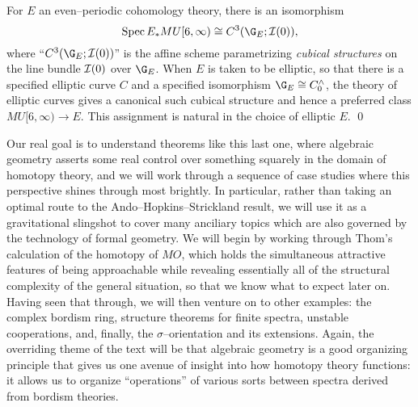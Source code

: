 \begin{theorem}\label{IntroAHSMU6Thm}
For $E$ an even--periodic cohomology theory, there is an isomorphism \[\Spec E_* MU[6, \infty) \cong C^3(\G_E; \sheaf I(0)),\] where ``$C^3(\G_E; \sheaf I(0))$'' is the affine scheme parametrizing \textit{cubical structures} on the line bundle $\mathcal{I}(0)$ over $\G_E$.  When $E$ is taken to be elliptic, so that there is a specified elliptic curve $C$ and a specified isomorphism $\G_E \cong C^\wedge_0$, the theory of elliptic curves gives a canonical such cubical structure and hence a preferred class $MU[6, \infty) \to E$.  This assignment is natural in the choice of elliptic $E$. \qed
\end{theorem}

Our real goal is to understand theorems like this last one, where algebraic geometry asserts some real control over something squarely in the domain of homotopy theory, and we will work through a sequence of case studies where this perspective shines through most brightly.  In particular, rather than taking an optimal route to the Ando--Hopkins--Strickland result, we will use it as a gravitational slingshot to cover many anciliary topics which are also governed by the technology of formal geometry.  We will begin by working through Thom's calculation of the homotopy of $MO$, which holds the simultaneous attractive features of being approachable while revealing essentially all of the structural complexity of the general situation, so that we know what to expect later on.  Having seen that through, we will then venture on to other examples: the complex bordism ring, structure theorems for finite spectra, unstable cooperations, and, finally, the $\sigma$--orientation and its extensions.  Again, the overriding theme of the text will be that algebraic geometry is a good organizing principle that gives us one avenue of insight into how homotopy theory functions: it allows us to organize ``operations'' of various sorts between spectra derived from bordism theories.

